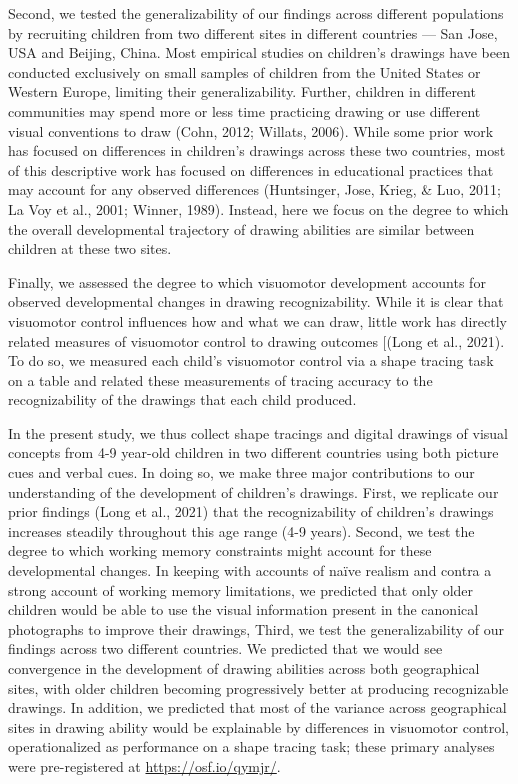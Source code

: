 \documentclass[
  english,
  man]{apa6}
\begin{document}
Second, we tested the generalizability of our findings across different populations by recruiting children from two different sites in different countries --- San Jose, USA and Beijing, China.
Most empirical studies on children's drawings have been conducted exclusively on small samples of children from the United States or Western Europe, limiting their generalizability. Further, children in different communities may spend more or less time practicing drawing or use different visual conventions to draw (Cohn, 2012; Willats, 2006). While some prior work has focused on differences in children's drawings across these two countries, most of this descriptive work has focused on differences in educational practices that may account for any observed differences (Huntsinger, Jose, Krieg, \& Luo, 2011; La Voy et al., 2001; Winner, 1989). Instead, here we focus on the degree to which the overall developmental trajectory of drawing abilities are similar between children at these two sites.

Finally, we assessed the degree to which visuomotor development accounts for observed developmental changes in drawing recognizability. While it is clear that visuomotor control influences how and what we can draw, little work has directly related measures of visuomotor control to drawing outcomes {[}(Long et al., 2021). To do so, we measured each child's visuomotor control via a shape tracing task on a table and related these measurements of tracing accuracy to the recognizability of the drawings that each child produced.

In the present study, we thus collect shape tracings and digital drawings of visual concepts from 4-9 year-old children in two different countries using both picture cues and verbal cues. In doing so, we make three major contributions to our understanding of the development of children's drawings. First, we replicate our prior findings (Long et al., 2021) that the recognizability of children's drawings increases steadily throughout this age range (4-9 years). Second, we test the degree to which working memory constraints might account for these developmental changes. In keeping with accounts of naïve realism and contra a strong account of working memory limitations, we predicted that only older children would be able to use the visual information present in the canonical photographs to improve their drawings, Third, we test the generalizability of our findings across two different countries. We predicted that we would see convergence in the development of drawing abilities across both geographical sites, with older children becoming progressively better at producing recognizable drawings. In addition, we predicted that most of the variance across geographical sites in drawing ability would be explainable by differences in visuomotor control, operationalized as performance on a shape tracing task; these primary analyses were pre-registered at \url{https://osf.io/qymjr/}.
\end{document}
